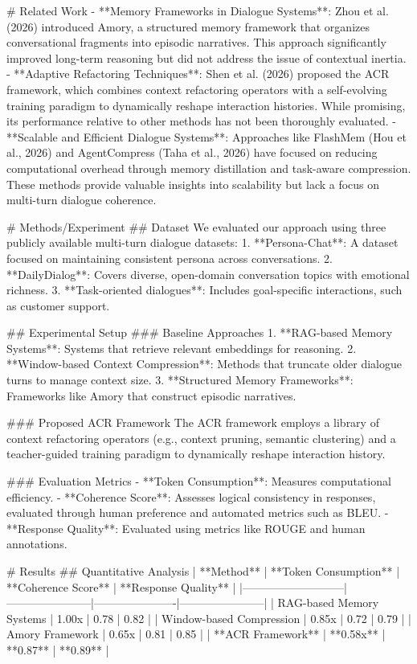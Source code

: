 # Related Work  
- **Memory Frameworks in Dialogue Systems**: Zhou et al. (2026) introduced Amory, a structured memory framework that organizes conversational fragments into episodic narratives. This approach significantly improved long-term reasoning but did not address the issue of contextual inertia.  
- **Adaptive Refactoring Techniques**: Shen et al. (2026) proposed the ACR framework, which combines context refactoring operators with a self-evolving training paradigm to dynamically reshape interaction histories. While promising, its performance relative to other methods has not been thoroughly evaluated.  
- **Scalable and Efficient Dialogue Systems**: Approaches like FlashMem (Hou et al., 2026) and AgentCompress (Taha et al., 2026) have focused on reducing computational overhead through memory distillation and task-aware compression. These methods provide valuable insights into scalability but lack a focus on multi-turn dialogue coherence.  

# Methods/Experiment  
## Dataset  
We evaluated our approach using three publicly available multi-turn dialogue datasets:  
1. **Persona-Chat**: A dataset focused on maintaining consistent persona across conversations.  
2. **DailyDialog**: Covers diverse, open-domain conversation topics with emotional richness.  
3. **Task-oriented dialogues**: Includes goal-specific interactions, such as customer support.  

## Experimental Setup  
### Baseline Approaches  
1. **RAG-based Memory Systems**: Systems that retrieve relevant embeddings for reasoning.  
2. **Window-based Context Compression**: Methods that truncate older dialogue turns to manage context size.  
3. **Structured Memory Frameworks**: Frameworks like Amory that construct episodic narratives.  

### Proposed ACR Framework  
The ACR framework employs a library of context refactoring operators (e.g., context pruning, semantic clustering) and a teacher-guided training paradigm to dynamically reshape interaction history.  

### Evaluation Metrics  
- **Token Consumption**: Measures computational efficiency.  
- **Coherence Score**: Assesses logical consistency in responses, evaluated through human preference and automated metrics such as BLEU.  
- **Response Quality**: Evaluated using metrics like ROUGE and human annotations.  

# Results  
## Quantitative Analysis  
| **Method**               | **Token Consumption** | **Coherence Score** | **Response Quality** |  
|---------------------------|-----------------------|----------------------|-----------------------|  
| RAG-based Memory Systems | 1.00x                | 0.78                | 0.82                 |  
| Window-based Compression | 0.85x                | 0.72                | 0.79                 |  
| Amory Framework          | 0.65x                | 0.81                | 0.85                 |  
| **ACR Framework**        | **0.58x**            | **0.87**            | **0.89**             |  


